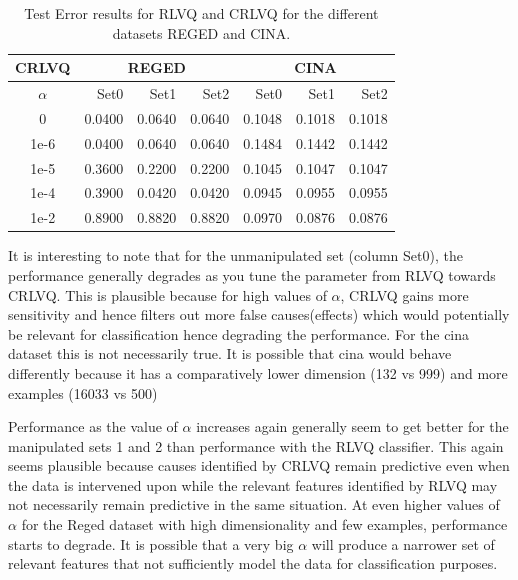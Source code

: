 \documentclass{esannV2}
\begin{document}
\begin{table}[!h]
	\centering
			\begin{footnotesize}
\begin{tabular}{|c|r|r|r|r|r|r|}
\hline
     CRLVQ &         \multicolumn{ 3}{|c|}{REGED} &          \multicolumn{ 3}{|c|}{CINA}  \\
\hline
$\alpha$ &     Set0 &       Set1 &       Set2 &       Set0 &       Set1 &       Set2 \\
\hline
  0    &     0.0400 &     0.0640 &     0.0640 &     0.1048 &     0.1018 &     0.1018 \\
\hline
  1e-6 &     0.0400 &     0.0640 &     0.0640 &     0.1484 &     0.1442 &     0.1442 \\
\hline
  1e-5 &     0.3600 &     0.2200 &     0.2200 &     0.1045 &     0.1047 &     0.1047  \\
\hline
  1e-4 &     0.3900 &     0.0420 &     0.0420 &     0.0945 &     0.0955 &     0.0955  \\
\hline
  1e-2 &     0.8900 &     0.8820 &     0.8820 &     0.0970 &     0.0876 &     0.0876  \\
\hline
\end{tabular}   
			\end{footnotesize}
	\caption{Test Error results for RLVQ and CRLVQ for the different datasets REGED and CINA.}
	\label{tab:TestErrorResults}
\end{table}

It is interesting to note that for the unmanipulated set (column Set0), the performance generally degrades as you tune the parameter from RLVQ towards CRLVQ. This is plausible because for high values of $\alpha$, CRLVQ gains more sensitivity and hence filters out more false causes(effects) which would potentially be relevant for classification hence degrading the performance. For the cina dataset this is not necessarily true. It is possible that cina would behave differently because it has a comparatively lower dimension (132 vs 999) and more examples (16033 vs 500)

Performance as the value of $\alpha$ increases again generally seem to get better for the manipulated sets 1 and 2 than performance with the RLVQ classifier. This again seems plausible because causes identified by CRLVQ remain predictive even when the data is intervened upon while the relevant features identified by RLVQ may not necessarily remain predictive in the same situation. At even higher values of $\alpha$ for the Reged dataset with high dimensionality and few examples, performance starts to degrade. It is possible that a very big $\alpha$ will produce a narrower set of relevant features that not sufficiently model the data for classification purposes.
\end{document}
